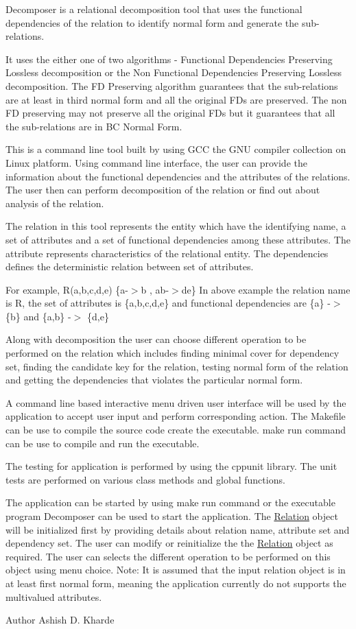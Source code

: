 Decomposer is a relational decomposition tool that uses the functional dependencies of the relation to identify normal form and generate the sub-\/relations.

It uses the either one of two algorithms -\/ Functional Dependencies Preserving Lossless decomposition or the Non Functional Dependencies Preserving Lossless decomposition. The FD Preserving algorithm guarantees that the sub-\/relations are at least in third normal form and all the original F\+Ds are preserved. The non FD preserving may not preserve all the original F\+Ds but it guarantees that all the sub-\/relations are in BC Normal Form.

This is a command line tool built by using G\+CC the G\+NU compiler collection on Linux platform. Using command line interface, the user can provide the information about the functional dependencies and the attributes of the relations. The user then can perform decomposition of the relation or find out about analysis of the relation.

The \textquotesingle{}relation\textquotesingle{} in this tool represents the entity which have the identifying name, a set of attributes and a set of functional dependencies among these attributes. The \textquotesingle{}attribute\textquotesingle{} represents characteristics of the relational entity. The dependencies defines the deterministic relation between set of attributes.

For example, R(a,b,c,d,e) \{a-\/$>$b , ab-\/$>$de\} In above example the relation name is R, the set of attributes is \{a,b,c,d,e\} and functional dependencies are \{a\} -\/$>$ \{b\} and \{a,b\} -\/$>$ \{d,e\}

Along with decomposition the user can choose different operation to be performed on the relation which includes finding minimal cover for dependency set, finding the candidate key for the relation, testing normal form of the relation and getting the dependencies that violates the particular normal form.

A command line based interactive menu driven user interface will be used by the application to accept user input and perform corresponding action. The Makefile can be use to compile the source code create the executable. make run command can be use to compile and run the executable.

The testing for application is performed by using the cppunit library. The unit tests are performed on various class methods and global functions.

The application can be started by using make run command or the executable program Decomposer can be used to start the application. The \hyperlink{class_relation}{Relation} object will be initialized first by providing details about relation name, attribute set and dependency set. The user can modify or reinitialize the the \hyperlink{class_relation}{Relation} object as required. The user can selects the different operation to be performed on this object using menu choice. Note\+: It is assumed that the input relation object is in at least first normal form, meaning the application currently do not supports the multivalued attributes.

\begin{DoxyAuthor}{Author}
Ashish D. Kharde 
\end{DoxyAuthor}
